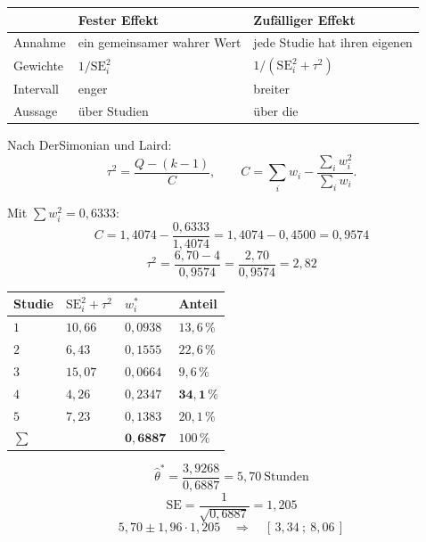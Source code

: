 \begin{merksatz}
\begin{center}
{\small
\renewcommand{\arraystretch}{1.55}
\begin{tabular}{@{}P{2.4cm}P{2.8cm}P{2.8cm}@{}}
\toprule
& \textbf{Fester Effekt} & \textbf{Zufälliger Effekt}\\
\midrule
Annahme & ein gemeinsamer wahrer Wert & jede Studie hat ihren eigenen\\
Gewichte & $1/\mathrm{SE}_i^2$ & $1/(\mathrm{SE}_i^2 + \tau^2)$\\
Intervall & enger & \textcolor{gruen}{breiter}\\
Aussage & über  Studien & über die \\
\bottomrule
\end{tabular}}
\end{center}

Nach DerSimonian und Laird:
\[ \tau^2 = \frac{Q - (k-1)}{C}, \qquad C = \sum_i w_i - \frac{\sum_i w_i^2}{\sum_i w_i} . \]

Mit $\sum w_i^2 = 0{,}6333$:
\[ C = 1{,}4074 - \frac{0{,}6333}{1{,}4074} = 1{,}4074 - 0{,}4500 = 0{,}9574 \]
\[ \tau^2 = \frac{6{,}70 - 4}{0{,}9574} = \frac{2{,}70}{0{,}9574} = 2{,}82 \]

\begin{center}
{\small
\renewcommand{\arraystretch}{1.4}
\begin{tabular}{@{}P{1.4cm}P{1.8cm}P{1.8cm}P{2.0cm}@{}}
\toprule
\textbf{Studie} & $\mathrm{SE}_i^2 + \tau^2$ & $w_i^{*}$ & \textbf{Anteil}\\
\midrule
$1$ & $10{,}66$ & $0{,}0938$ & $13{,}6\,\%$\\
$2$ & $6{,}43$ & $0{,}1555$ & $22{,}6\,\%$\\
$3$ & $15{,}07$ & $0{,}0664$ & $9{,}6\,\%$\\
$4$ & $4{,}26$ & $0{,}2347$ & $\mathbf{34{,}1\,\%}$\\
$5$ & $7{,}23$ & $0{,}1383$ & $20{,}1\,\%$\\
\midrule
$\sum$ & & $\mathbf{0{,}6887}$ & $100\,\%$\\
\bottomrule
\end{tabular}}
\end{center}

\[ \hat\theta^{*} = \frac{3{,}9268}{0{,}6887} = 5{,}70 \ \text{Stunden} \]
\[ \mathrm{SE} = \frac{1}{\sqrt{0{,}6887}} = 1{,}205 \]
\[ 5{,}70 \pm 1{,}96 \cdot 1{,}205 \quad\Longrightarrow\quad [\,3{,}34\ ;\ 8{,}06\,] \]


\end{merksatz}

